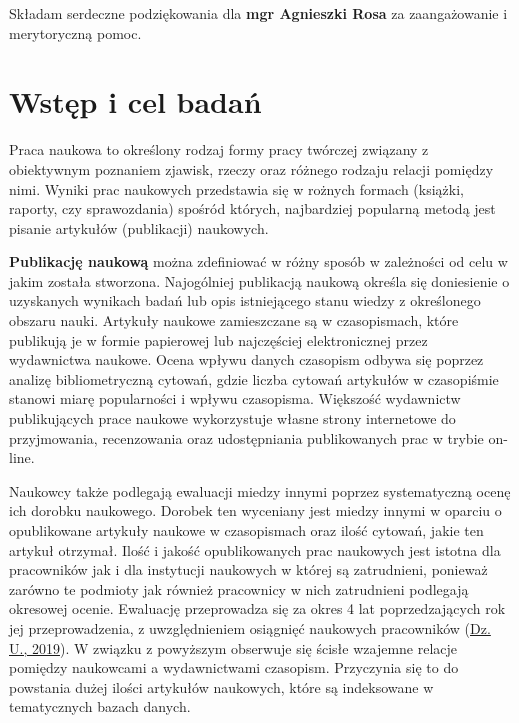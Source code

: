 \documentclass[
  12pt,
]{article}
\begin{document}
Składam serdeczne podziękowania dla \textbf{mgr Agnieszki Rosa} za
zaangażowanie i merytoryczną pomoc.

\newpage
{}
\setcounter{tocdepth}{2}
\tableofcontents
{}

\newpage

\newpage
{}

\hypertarget{wstux119p-i-cel-badaux144}{%
\section{\texorpdfstring{Wstęp i cel
badań\label{label1}}{Wstęp i cel badań}}\label{wstux119p-i-cel-badaux144}}

Praca naukowa to określony rodzaj formy pracy twórczej związany z
obiektywnym poznaniem zjawisk, rzeczy oraz różnego rodzaju relacji
pomiędzy nimi. Wyniki prac naukowych przedstawia się w rożnych formach
(książki, raporty, czy sprawozdania) spośród których, najbardziej
popularną metodą jest pisanie artykułów (publikacji) naukowych.

\textbf{Publikację naukową} można zdefiniować w różny sposób w
zależności od celu w jakim została stworzona. Najogólniej publikacją
naukową określa się doniesienie o uzyskanych wynikach badań lub opis
istniejącego stanu wiedzy z określonego obszaru nauki. Artykuły naukowe
zamieszczane są w czasopismach, które publikują je w formie papierowej
lub najczęściej elektronicznej przez wydawnictwa naukowe. Ocena wpływu
danych czasopism odbywa się poprzez analizę bibliometryczną cytowań,
gdzie liczba cytowań artykułów w czasopiśmie stanowi miarę popularności
i wpływu czasopisma. Większość wydawnictw publikujących prace naukowe
wykorzystuje własne strony internetowe do przyjmowania, recenzowania
oraz udostępniania publikowanych prac w trybie on-line.

Naukowcy także podlegają ewaluacji miedzy innymi poprzez systematyczną
ocenę ich dorobku naukowego. Dorobek ten wyceniany jest miedzy innymi w
oparciu o opublikowane artykuły naukowe w czasopismach oraz ilość
cytowań, jakie ten artykuł otrzymał. Ilość i jakość opublikowanych prac
naukowych jest istotna dla pracowników jak i dla instytucji naukowych w
której są zatrudnieni, ponieważ zarówno te podmioty jak również
pracownicy w nich zatrudnieni podlegają okresowej ocenie. Ewaluację
przeprowadza się za okres 4 lat poprzedzających rok jej przeprowadzenia,
z uwzględnieniem osiągnięć naukowych pracowników
(\protect\hyperlink{ref-dz.u.2019}{Dz. U., 2019}). W związku z powyższym
obserwuje się ścisłe wzajemne relacje pomiędzy naukowcami a
wydawnictwami czasopism. Przyczynia się to do powstania dużej ilości
artykułów naukowych, które są indeksowane w tematycznych bazach danych.
\end{document}
